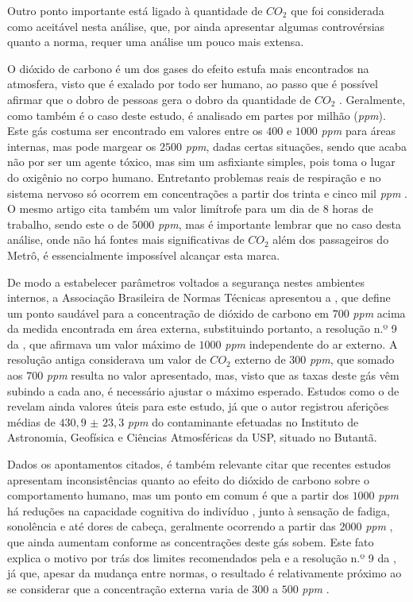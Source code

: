 \documentclass[acronym,symbols,table]{fei}
\begin{document}
Outro ponto importante está ligado à quantidade de ${CO}_{2}$ que foi considerada como aceitável nesta análise, que, por ainda apresentar algumas controvérsias quanto a norma, requer uma análise um pouco mais extensa. 

O dióxido de carbono é um dos gases do efeito estufa mais encontrados na atmosfera, visto que é exalado por todo ser humano, ao passo que é possível afirmar que o dobro de pessoas gera o dobro da quantidade de ${CO}_{2}$ \cite{ashrae2001}. Geralmente, como também é o caso deste estudo, é analisado em partes por milhão (\textit{ppm}). Este gás costuma ser encontrado em valores entre os $400$ e $1000$ \textit{ppm} para áreas internas, mas pode margear os $2500$ \textit{ppm}, dadas certas situações, sendo que acaba não por ser um agente tóxico, mas sim um asfixiante simples, pois toma o lugar do oxigênio no corpo humano. Entretanto problemas reais de respiração e no sistema nervoso só ocorrem em concentrações a partir dos trinta e cinco mil \textit{ppm} \cite{handbook2017ashrae}. O mesmo artigo cita também um valor limítrofe para um dia de 8 horas de trabalho, sendo este o de $5000$ \textit{ppm}, mas é importante lembrar que no caso desta análise, onde não há fontes mais significativas de ${CO}_{2}$ além dos passageiros do Metrô, é essencialmente impossível alcançar esta marca.

De modo a estabelecer parâmetros voltados a segurança nestes ambientes internos, a Associação Brasileira de Normas Técnicas apresentou a \textcite{abnt17037}, que define um ponto saudável para a concentração de dióxido de carbono em $700$ \textit{ppm} acima da medida encontrada em área externa, substituindo portanto, a resolução n.º 9 da \textcite{anvisar9}, que afirmava um valor máximo de $1000$ \textit{ppm} independente do ar externo. A resolução antiga considerava um valor de ${CO}_{2}$ externo de $300$ \textit{ppm}, que somado aos $700$ \textit{ppm} resulta no valor apresentado, mas, visto que as taxas deste gás vêm subindo a cada ano, é necessário ajustar o máximo esperado. Estudos como o de \textcite{stoco} revelam ainda valores úteis para este estudo, já que o autor registrou aferições médias de $430,9$ $\pm$ $23,3$ \textit{ppm} do contaminante efetuadas no Instituto de Astronomia, Geofísica e Ciências Atmosféricas da USP, situado no Butantã.

Dados os apontamentos citados, é também relevante citar que recentes estudos apresentam inconsistências quanto ao efeito do dióxido de carbono sobre o comportamento humano, mas um ponto em comum é que a partir dos $1000$ \textit{ppm} há reduções na capacidade cognitiva do indivíduo \cite{astmD6245}, junto à sensação de fadiga, sonolência e até dores de cabeça, geralmente ocorrendo a partir das $2000$ \textit{ppm} \cite{silvaco2}, que ainda aumentam conforme as concentrações deste gás sobem. Este fato explica o motivo por trás dos limites recomendados pela \textcite{abnt17037} e a resolução n.º 9 da \textcite{anvisar9}, já que, apesar da mudança entre normas, o resultado é relativamente próximo ao se considerar que a concentração externa varia de $300$ a $500$ \textit{ppm} \cite{ashrae2016}. 
\end{document}
